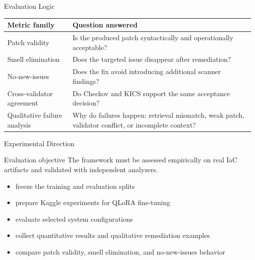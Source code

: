 \documentclass[aspectratio=169,10pt]{beamer}
\begin{document}
\begin{frame}{Evaluation Logic}
\begin{tabularx}{\linewidth}{>{\raggedright\arraybackslash}p{3cm}X}
\toprule
\textbf{Metric family} & \textbf{Question answered} \\
\midrule
Patch validity & Is the produced patch syntactically and operationally acceptable? \\
Smell elimination & Does the targeted issue disappear after remediation? \\
No-new-issues & Does the fix avoid introducing additional scanner findings? \\
Cross-validator agreement & Do Checkov and KICS support the same acceptance decision? \\
Qualitative failure analysis & Why do failures happen: retrieval mismatch, weak patch, validator conflict, or incomplete context? \\
\bottomrule
\end{tabularx}
\end{frame}

\begin{frame}{Experimental Direction}
\begin{block}{Evaluation objective}
The framework must be assessed empirically on real IaC artifacts and validated with independent analyzers.
\end{block}
\begin{itemize}
  \item freeze the training and evaluation splits
  \item prepare Kaggle experiments for QLoRA fine-tuning
  \item evaluate selected system configurations
  \item collect quantitative results and qualitative remediation examples
  \item compare patch validity, smell elimination, and no-new-issues behavior
\end{itemize}
\end{frame}
\end{document}
